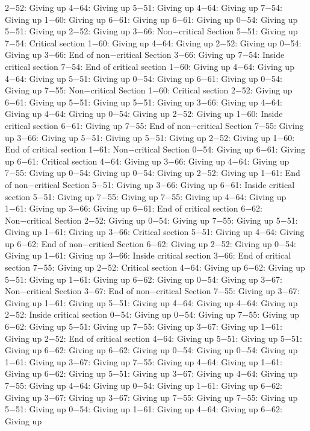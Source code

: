 2−52: Giving up
4−64: Giving up
5−51: Giving up
4−64: Giving up
7−54: Giving up
1−60: Giving up
6−61: Giving up
6−61: Giving up
0−54: Giving up
5−51: Giving up
2−52: Giving up
3−66: Non−critical Section
5−51: Giving up
7−54: Critical section
1−60: Giving up
4−64: Giving up
2−52: Giving up
0−54: Giving up
3−66: End of non−critical Section
3−66: Giving up
7−54: Inside critical section
7−54: End of critical section
1−60: Giving up
4−64: Giving up
4−64: Giving up
5−51: Giving up
0−54: Giving up
6−61: Giving up
0−54: Giving up
7−55: Non−critical Section
1−60: Critical section
2−52: Giving up
6−61: Giving up
5−51: Giving up
5−51: Giving up
3−66: Giving up
4−64: Giving up
4−64: Giving up
0−54: Giving up
2−52: Giving up
1−60: Inside critical section
6−61: Giving up
7−55: End of non−critical Section
7−55: Giving up
3−66: Giving up
5−51: Giving up
5−51: Giving up
2−52: Giving up
1−60: End of critical section
1−61: Non−critical Section
0−54: Giving up
6−61: Giving up
6−61: Critical section
4−64: Giving up
3−66: Giving up
4−64: Giving up
7−55: Giving up
0−54: Giving up
0−54: Giving up
2−52: Giving up
1−61: End of non−critical Section
5−51: Giving up
3−66: Giving up
6−61: Inside critical section
5−51: Giving up
7−55: Giving up
7−55: Giving up
4−64: Giving up
1−61: Giving up
3−66: Giving up
6−61: End of critical section
6−62: Non−critical Section
2−52: Giving up
0−54: Giving up
7−55: Giving up
5−51: Giving up
1−61: Giving up
3−66: Critical section
5−51: Giving up
4−64: Giving up
6−62: End of non−critical Section
6−62: Giving up
2−52: Giving up
0−54: Giving up
1−61: Giving up
3−66: Inside critical section
3−66: End of critical section
7−55: Giving up
2−52: Critical section
4−64: Giving up
6−62: Giving up
5−51: Giving up
1−61: Giving up
6−62: Giving up
0−54: Giving up
3−67: Non−critical Section
3−67: End of non−critical Section
7−55: Giving up
3−67: Giving up
1−61: Giving up
5−51: Giving up
4−64: Giving up
4−64: Giving up
2−52: Inside critical section
0−54: Giving up
0−54: Giving up
7−55: Giving up
6−62: Giving up
5−51: Giving up
7−55: Giving up
3−67: Giving up
1−61: Giving up
2−52: End of critical section
4−64: Giving up
5−51: Giving up
5−51: Giving up
6−62: Giving up
6−62: Giving up
0−54: Giving up
0−54: Giving up
1−61: Giving up
3−67: Giving up
7−55: Giving up
4−64: Giving up
1−61: Giving up
6−62: Giving up
5−51: Giving up
3−67: Giving up
4−64: Giving up
7−55: Giving up
4−64: Giving up
0−54: Giving up
1−61: Giving up
6−62: Giving up
3−67: Giving up
3−67: Giving up
7−55: Giving up
7−55: Giving up
5−51: Giving up
0−54: Giving up
1−61: Giving up
4−64: Giving up
6−62: Giving up
